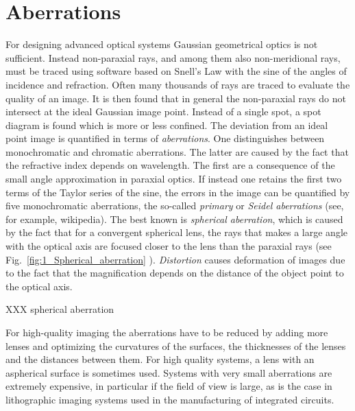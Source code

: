 \section{Aberrations}
For designing advanced optical systems Gaussian geometrical optics is not sufficient. 
Instead non-paraxial rays, and among them also non-meridional rays, must be traced  using software based on Snell's Law with the sine of the angles of incidence and refraction. Often many thousands of rays are  traced to evaluate the quality of an image. 
It is then found that in general the non-paraxial rays do not intersect at the ideal Gaussian image point. Instead of a single spot, a spot diagram is found which is more or less confined. The deviation from an ideal point image  is quantified in terms of  \emph{aberrations}. One distinguishes between monochromatic and chromatic aberrations. The latter are caused by the fact that the refractive index depends on wavelength. The first are a consequence of the small angle approximation in paraxial optics. If instead one retains the first two terms of the Taylor series of the sine,  the errors in the image can be quantified by  five monochromatic aberrations, the so-called \emph{primary} or \emph{Seidel aberrations} (see, for example, wikipedia). The best known  is \emph{spherical aberration}, which is caused by the fact that for a convergent spherical lens, the rays that makes a large angle with the optical axis are focused closer to the lens than the paraxial rays (see Fig.~\ref{fig:1_Spherical_aberration}
). \emph{Distortion} causes deformation of images due to the fact that the magnification depends on the distance of the object point to the optical axis.



\begin{marginfigure}
   \caption{XXX spherical aberration}
\label{fig:1_Spherical_aberration}
\end{marginfigure}



For high-quality imaging the aberrations have to be reduced by adding more lenses and optimizing  the curvatures of the surfaces, the thicknesses of the lenses and  the distances between them. For high quality systems,  a lens with an aspherical surface is sometimes used.  Systems with very small aberrations are extremely expensive, in particular if the field of view is large, as is the case in  lithographic imaging systems used in the manufacturing of integrated circuits.




